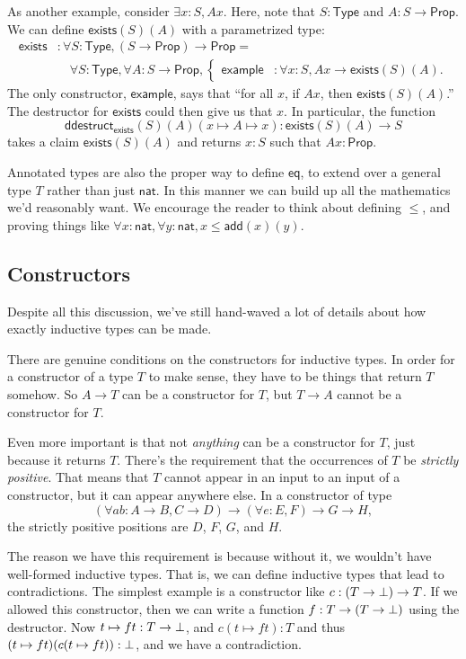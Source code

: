 \documentclass[11pt,paper=letter]{scrartcl}
\newcommand{\sf}{\mathsf}
\newcommand{\prop}{\mathsf{Prop}}
\newcommand{\type}{\mathsf{Type}}
\begin{document}
As another example, consider $\exists x: S, Ax$. Here, note that $S: \type$ and $A : S \to \prop$. We can define $\sf{exists}(S)(A)$ with a parametrized type:
\begin{align*}
\sf{exists}&: \forall S: \type, (S \to \prop) \to \prop =\\
&\quad\!\forall S: \type, \forall A:S \to \prop, \begin{cases}
  \sf{example}&: \forall x: S, Ax \to \sf{exists}(S)(A).
\end{cases}
\end{align*}
The only constructor, $\sf{example}$, says that ``for all $x$, if $Ax$, then $\sf{exists}(S)(A)$.'' The destructor for $\sf{exists}$ could then give us that $x$. In particular, the function \[
  \sf{ddestruct}_\sf{exists}(S)(A)(x \mapsto A \mapsto x) : \sf{exists}(S)(A) \to S
\]
takes a claim $\sf{exists}(S)(A)$ and returns $x : S$ such that $Ax : \prop$.

Annotated types are also the proper way to define $\sf{eq}$, to extend over a general type $T$ rather than just $\sf{nat}$. In this manner we can build up all the mathematics we'd reasonably want. We encourage the reader to think about defining $\le$, and proving things like $\forall x: \sf{nat}, \forall y: \sf{nat}, x \le \sf{add}(x)(y)$.

\subsection{Constructors}

Despite all this discussion, we've still hand-waved a lot of details about how exactly inductive types can be made.

There are genuine conditions on the constructors for inductive types. In order for a constructor of a type $T$ to make sense, they have to be things that return $T$ somehow. So $A \to T$ can be a constructor for $T$, but $T \to A$ cannot be a constructor for $T$.

Even more important is that not \emph{anything} can be a constructor for $T$, just because it returns $T$. There's the requirement that the occurrences of $T$ be \emph{strictly positive}. That means that $T$ cannot appear in an input to an input of a constructor, but it can appear anywhere else. In a constructor of type \[
\left(\forall ab: A \to B, C \to D\right) \to (\forall e: E, F) \to G \to H,
\]
the strictly positive positions are $D$, $F$, $G$, and $H$.

The reason we have this requirement is because without it, we wouldn't have well-formed inductive types. That is, we can define inductive types that lead to contradictions. The simplest example is a constructor like $c: (T \to \bot) \to T$. If we allowed this constructor, then we can write a function $f : T \to (T \to \bot)$ using the destructor. Now $t \mapsto ft : T \to \bot$, and $c(t \mapsto ft) : T$ and thus $(t \mapsto ft)(c(t \mapsto ft)) : \bot$, and we have a contradiction.
\end{document}
